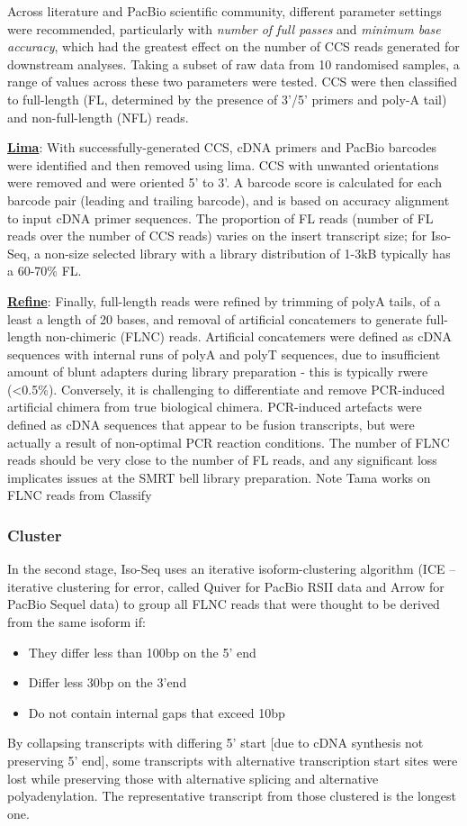 Across literature and PacBio scientific community, different parameter settings were recommended, particularly with \textit{number of full passes} and \textit{minimum base accuracy}, which had the greatest effect on the number of CCS reads generated for downstream analyses. Taking a subset of raw data from 10 randomised samples, a range of values across these two parameters were tested. CCS were then classified to full-length (FL, determined by the presence of 3'/5' primers and poly-A tail) and non-full-length (NFL) reads. 

\uline{\textbf{Lima}}: With successfully-generated CCS, cDNA primers and PacBio barcodes were identified and then removed using lima. CCS with unwanted orientations were removed and were oriented 5’ to 3’. A barcode score is calculated for each barcode pair (leading and trailing barcode), and is based on accuracy alignment to input cDNA primer sequences. The proportion of FL reads (number of FL reads over the number of CCS reads) varies on the insert transcript size; for Iso-Seq, a non-size selected library with a library distribution of 1-3kB typically has a 60-70\% FL. 

\uline{\textbf{Refine}}: Finally, full-length reads were refined by trimming of polyA tails, of a least a length of 20 bases, and removal of artificial concatemers to generate full-length non-chimeric (FLNC) reads. Artificial concatemers were defined as cDNA sequences with internal runs of polyA and polyT sequences, due to insufficient amount of blunt adapters during library preparation - this is typically rwere (<0.5\%). Conversely, it is challenging to differentiate and remove PCR-induced artificial chimera from true biological chimera. PCR-induced artefacts were defined as cDNA sequences that appear to be fusion transcripts, but were actually a result of non-optimal PCR reaction conditions. The number of FLNC reads should be very close to the number of FL reads, and any significant loss implicates issues at the SMRT bell library preparation.
Note Tama works on FLNC reads from Classify 

\subsubsection{Cluster}
In the second stage, Iso-Seq uses an iterative isoform-clustering algorithm (ICE – iterative clustering for error, called Quiver for PacBio RSII data and Arrow for PacBio Sequel data) to group all FLNC reads that were thought to be derived from the same isoform if: 
\begin{itemize}
	\item They differ less than 100bp on the 5’ end 
	\item Differ less 30bp on the 3’end 
	\item Do not contain internal gaps that exceed 10bp
\end{itemize}
By collapsing transcripts with differing 5' start [due to cDNA synthesis not preserving 5' end], some transcripts with alternative transcription start sites were lost while preserving those with alternative splicing and alternative polyadenylation. The representative transcript from those clustered is the longest one. 

